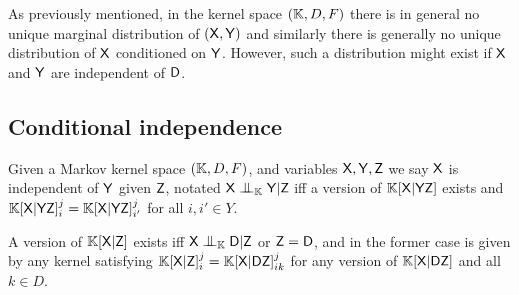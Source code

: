 As previously mentioned, in the kernel space $(\mathbb{K},D,F)$ there is in general no unique marginal distribution of $(\mathsf{X},\mathsf{Y})$ and similarly there is generally no unique distribution of $\mathsf{X}$ conditioned on $\mathsf{Y}$. However, such a distribution might exist if $\mathsf{X}$ and $\mathsf{Y}$ are independent of $\mathsf{D}$.

\subsection{Conditional independence}\label{ssec:cond_indep}

Given a Markov kernel space $(\mathbb{K}, D, F)$, and variables $\mathsf{X},\mathsf{Y}, \mathsf{Z}$ we say $\mathsf{X}$ is independent of $\mathsf{Y}$ given $\mathsf{Z}$, notated $\RV{X}\CI_{\kernel{K}} \RV{Y}|\RV{Z}$ iff a version of $\mathbb{K}[\mathsf{X}|\mathsf{YZ}]$ exists and $\mathbb{K}[\mathsf{X}|\mathsf{YZ}]_i^j = \mathbb{K}[\mathsf{X}|\mathsf{YZ}]_{i'}^j$ for all $i,i'\in Y$.

A version of $\mathbb{K}[\mathsf{X}|\mathsf{Z}]$ exists iff $\RV{X}\CI_{\kernel{K}} \RV{D}|\RV{Z}$ or $\mathsf{Z}=\mathsf{D}$, and in the former case is given by any kernel satisfying $\mathbb{K}[\mathsf{X}|\mathsf{Z}]_i^j = \mathbb{K}[{\mathsf{X}|\mathsf{DZ}}]_{ik}^j$ for any version of $\mathbb{K}[\mathsf{X}|\mathsf{DZ}]$ and all $k\in D$.